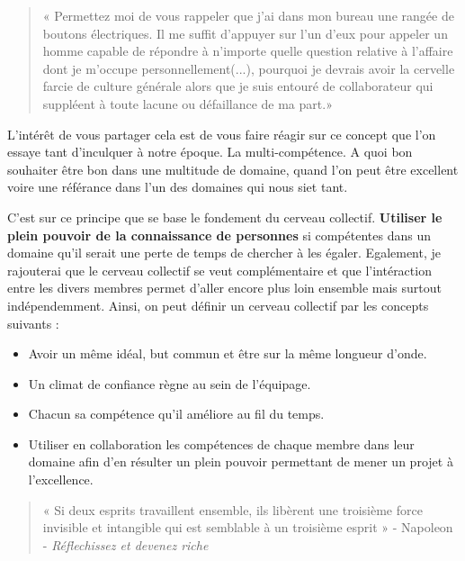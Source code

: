 					\begin{quote}
					« Permettez moi de vous rappeler que j'ai dans mon bureau une rangée de boutons électriques. Il me suffit d'appuyer sur l'un d'eux pour appeler un homme capable de répondre à n'importe quelle question relative à l'affaire dont je m'occupe personnellement(...), pourquoi je devrais avoir la cervelle farcie de culture générale alors que je suis entouré de collaborateur qui suppléent à toute lacune ou défaillance de ma part.»
					\end{quote}

			L'intérêt de vous partager cela est de vous faire réagir sur ce concept que l'on essaye tant d'inculquer à notre époque. La multi-compétence. A quoi bon souhaiter être bon dans une multitude de domaine, quand l'on peut être excellent voire une référance dans l'un des domaines qui nous siet tant.

			C'est sur ce principe que se base le fondement du cerveau collectif. \textbf{Utiliser le plein pouvoir de la connaissance de personnes} si compétentes dans un domaine qu'il serait une perte de temps de chercher à les égaler.
			Egalement, je rajouterai que le cerveau collectif se veut complémentaire et que l'intéraction entre les divers membres permet d'aller encore plus loin ensemble mais surtout indépendemment.
			Ainsi, on peut définir un cerveau collectif par les concepts suivants : \\

			\begin{itemize}[label=\textbullet, font=\LARGE \color{burntorange}]
				\item Avoir un même idéal, but commun et être sur la même longueur d'onde.
				\item Un climat de confiance règne au sein de l'équipage.
				\item Chacun sa compétence qu'il améliore au fil du temps.
				\item Utiliser en collaboration les compétences de chaque membre dans leur domaine afin d'en résulter un plein pouvoir permettant de mener un projet à l'excellence.
			\end{itemize}

			\begin{quote}
			 « Si deux esprits travaillent ensemble, ils libèrent une troisième force invisible et intangible qui est semblable à un troisième esprit » - Napoleon  - \emph{Réflechissez et devenez riche}
			\end{quote}

